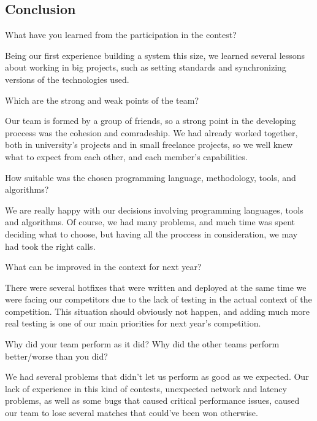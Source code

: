 \subsection{Conclusion}
\setcounter{question}{0}
\begin{question}
What have you learned from the participation in the contest?
\end{question}

Being our first experience building a system this size, we learned several 
lessons about working in big projects, such as setting standards and 
synchronizing versions of the technologies used.

\begin{question}
Which are the strong and weak points of the team?
\end{question}

    Our team is formed by a group of friends, so a strong point in the
    developing proccess was the cohesion and comradeship. We had
    already worked together, both in university's projects and in
    small freelance projects, so we well knew what to expect from each other,
    and each member's capabilities.

\begin{question}  
How suitable was the chosen programming language, methodology, tools, and
algorithms?
\end{question}

    We are really happy with our decisions involving programming languages,
    tools and algorithms. Of course, we had many problems, and much time was
    spent deciding what to choose, but having all the proccess in
    consideration, we may had took the right calls.

\begin{question}
What can be improved in the context for next year?
\end{question}

There were several hotfixes that were written and deployed at the same 
time we were facing our competitors due to the lack of testing in the 
actual context of the competition. This situation should obviously not 
happen, and adding much more real testing is one of our main priorities 
for next year's competition.

\begin{question}
Why did your team perform as it did? Why did the other teams perform
better/worse than you did?
\end{question}
We had several problems that didn't let us perform as good as we expected.
Our lack of experience in this kind of contests, unexpected network and latency
problems, as well as some bugs that caused critical performance issues, caused
our team to lose several matches that could've been won otherwise.

